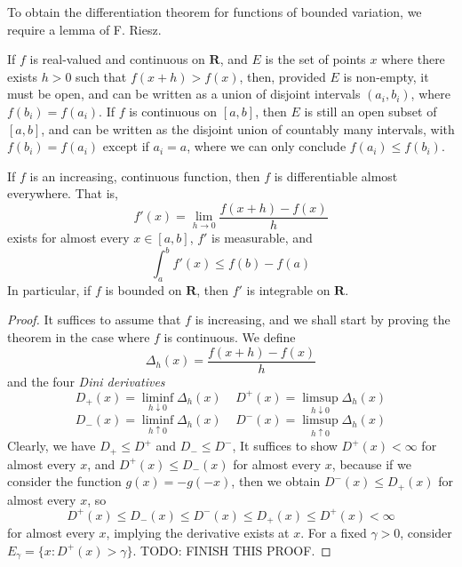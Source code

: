 To obtain the differentiation theorem for functions of bounded variation, we require a lemma of F. Riesz.

\begin{lemma}
    If $f$ is real-valued and continuous on $\mathbf{R}$, and $E$ is the set of points $x$ where there exists $h > 0$ such that $f(x+h) > f(x)$, then, provided $E$ is non-empty, it must be open, and can be written as a union of disjoint intervals $(a_i,b_i)$, where $f(b_i) = f(a_i)$. If $f$ is continuous on $[a,b]$, then $E$ is still an open subset of $[a,b]$, and can be written as the disjoint union of countably many intervals, with $f(b_i) = f(a_i)$ except if $a_i = a$, where we can only conclude $f(a_i) \leq f(b_i)$.
\end{lemma}

\begin{theorem}
    If $f$ is an increasing, continuous function, then $f$ is differentiable almost everywhere. That is,
    \[ f'(x) = \lim_{h \to 0} \frac{f(x+h) - f(x)}{h} \]
    exists for almost every $x \in [a,b]$, $f'$ is measurable, and
    \[ \int_a^b f'(x) \leq f(b) - f(a) \]
    In particular, if $f$ is bounded on $\mathbf{R}$, then $f'$ is integrable on $\mathbf{R}$.
\end{theorem}
\begin{proof}
    It suffices to assume that $f$ is increasing, and we shall start by proving the theorem in the case where $f$ is continuous. We define
    \[ \Delta_h(x) = \frac{f(x+h) - f(x)}{h} \]
    and the four {\it Dini derivatives}
    \[ D_+(x) = \liminf_{h \downarrow 0} \Delta_h(x)\ \ \ \ \ D^+(x) = \limsup_{h \downarrow 0} \Delta_h(x) \]
    \[ D_-(x) = \liminf_{h \uparrow 0} \Delta_h(x)\ \ \ \ \ D^-(x) = \limsup_{h \uparrow 0} \Delta_h(x) \]
    Clearly, we have $D_+ \leq D^+$ and $D_- \leq D^-$, It suffices to show $D^+(x) < \infty$ for almost every $x$, and $D^+(x) \leq D_-(x)$ for almost every $x$, because if we consider the function $g(x) = -g(-x)$, then we obtain $D^-(x) \leq D_+(x)$ for almost every $x$, so
    \[ D^+(x) \leq D_-(x) \leq D^-(x) \leq D_+(x) \leq D^+(x) < \infty \]
    for almost every $x$, implying the derivative exists at $x$. For a fixed $\gamma > 0$, consider $E_\gamma = \{ x: D^+(x) > \gamma \}$. TODO: FINISH THIS PROOF.
\end{proof}

